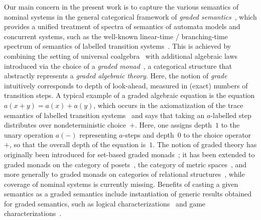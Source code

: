 \documentclass[11pt,a4paper]{amsart}
\theoremstyle{plain}
\numberwithin{equation}{section}
\newcommand{\+}[1]{\mathcal{#1}\xspace}
\theoremstyle{definition}
\begin{document}
Our main concern in the present work is to capture the various
semantics of nominal systems in the general categorical framework of
\emph{graded semantics}~\cite{MiliusEA15}, which provides a unified
treatment of spectra of semantics of automata models and concurrent
systems, such as the well-known linear-time / branching-time spectrum
of semantics of labelled transition systems~\cite{DorschEA19}. This is
achieved by combining the setting of universal
coalgebra~\cite{Rutten00} with additional algebraic laws introduced
via the choice of a \emph{graded monad}~\cite{Smirnov08}, a
categorical structure that abstractly represents a \emph{graded
  algebraic theory}. Here, the notion of \emph{grade} intuitively
corresponds to depth of look-ahead, measured in (exact) numbers of
transition steps. A typical example of a graded algebraic equation is
the equation $a(x+y)=a(x)+a(y)$, which occurs in the axiomatization of
the trace semantics of labelled transition systems~\cite{DorschEA19}
and says that taking an $a$-labelled step distributes over
nondeterministic choice~$+$. Here, one assigns depth~$1$ to the unary
operation $a(-)$ representing $a$-steps and depth~$0$ to the choice
operator~$+$, so that the overall depth of the equation is~$1$. The
notion of graded theory has originally been introduced for set-based
graded monads~\cite{Smirnov08}; it has been extended to graded monads
on the category of posets~\cite{FordEA21}, the category of metric
spaces~\cite{ForsterEA25a}, and more generally to graded monads on
categories of relational structures~\cite{FordThesis,ForsterEA25b},
while coverage of nominal systems is currently missing. Benefits of
casting a given semantics as a graded semantics include instantiation
of generic results obtained for graded semantics, such as logical
characterizations~\cite{MiliusEA15,DorschEA19,FordEA21,ForsterEA25a}
and game characterizations~\cite{FordEA22,ForsterEA25b}.
\end{document}
